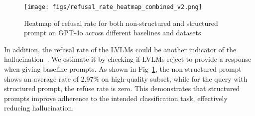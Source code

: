 \begin{figure}[h]
    \centering
    \texttt{[image: figs/refusal\_rate\_heatmap\_combined\_v2.png]}
    \vspace{-2mm}
    \caption{Heatmap of refusal rate for both non-structured and structured prompt on GPT-4o across different baselines and datasets}
    \label{fig:combined_analysis_heatmap}
    \vspace{-2mm}
\end{figure}



In addition, the refusal rate of the LVLMs could be another indicator of the hallucination~\cite{magesh2024hallucination}. 
We estimate it by checking if LVLMs reject to provide a response when giving baseline prompts. As shown in Fig~\ref{fig:combined_analysis_heatmap}, the non-structured prompt shows an average rate of 2.97\% on \vidfor high-quality subset, while for the query with structured prompt, the refuse rate is zero. This demonstrates that structured prompts improve adherence to the intended classification task, effectively reducing hallucination.





 

